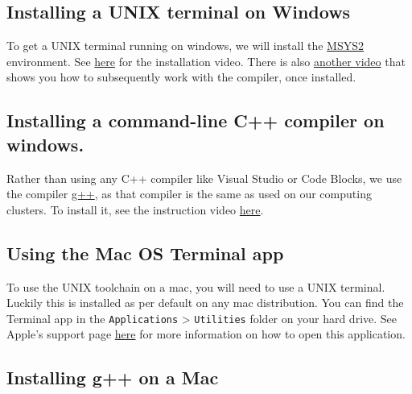 \documentclass[
]{book}
\begin{document}
\hypertarget{installing-a-unix-terminal-on-windows}{%
\subsection{Installing a UNIX terminal on Windows}\label{installing-a-unix-terminal-on-windows}}

To get a UNIX terminal running on windows, we will install the \href{https://www.msys2.org/}{MSYS2} environment. See \href{https://recapexeter.cloud.panopto.eu/Panopto/Pages/Viewer.aspx?id=f2acdf3c-224e-49be-8ae3-ad2400f2b3c1\&start=0}{here} for the installation video. There is also \href{https://recapexeter.cloud.panopto.eu/Panopto/Pages/Viewer.aspx?id=376342e6-5791-4c25-b2e3-ad2400ffe304\&start=0}{another video} that shows you how to subsequently work with the compiler, once installed.

\hypertarget{installing-a-command-line-c-compiler-on-windows.}{%
\subsection{Installing a command-line C++ compiler on windows.}\label{installing-a-command-line-c-compiler-on-windows.}}

Rather than using any C++ compiler like Visual Studio or Code Blocks, we use the compiler \href{https://gcc.gnu.org/}{g++}, as that compiler is the same as used on our computing clusters. To install it, see the instruction video \href{https://recapexeter.cloud.panopto.eu/Panopto/Pages/Viewer.aspx?id=f2acdf3c-224e-49be-8ae3-ad2400f2b3c1\&start=0}{here}.

\hypertarget{MacTerminal}{%
\subsection{Using the Mac OS Terminal app}\label{MacTerminal}}

To use the UNIX toolchain on a mac, you will need to use a UNIX terminal. Luckily this is installed as per default on any mac distribution. You can find the Terminal app in the \texttt{Applications} \textgreater{} \texttt{Utilities} folder on your hard drive. See Apple's support page \href{https://support.apple.com/en-gb/guide/terminal/apd5265185d-f365-44cb-8b09-71a064a42125/mac}{here} for more information on how to open this application.

\hypertarget{installing-g-on-a-mac}{%
\subsection{Installing g++ on a Mac}\label{installing-g-on-a-mac}}
\end{document}
